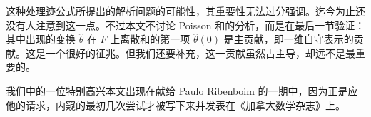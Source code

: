 这种处理迹公式所提出的解析问题的可能性，其重要性无法过分强调。迄今为止还没有人注意到这一点。不过本文不讨论 Poisson 和的分析，而是在最后一节验证：其中出现的变换 $\hat\theta$ 在 $F$ 上离散和的第一项 $\hat\theta(0)$ 是主贡献，即一维自守表示的贡献。这是一个很好的征兆。但我们还要补充，这一贡献虽然占主导，却远不是最重要的。

我们中的一位特别高兴本文出现在献给 Paulo Ribenboim 的一期中，因为正是应他的请求，内窥的最初几次尝试才被写下来并发表在《加拿大数学杂志》上。
